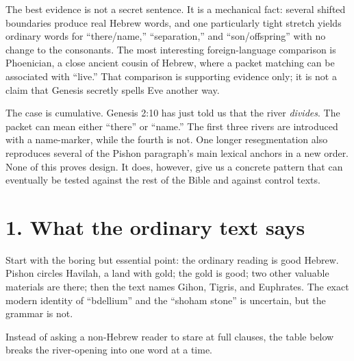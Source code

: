 The best evidence is not a secret sentence. It is a mechanical fact: several shifted boundaries produce real Hebrew words, and one particularly tight stretch yields ordinary words for ``there/name,'' ``separation,'' and ``son/offspring'' with no change to the consonants. The most interesting foreign-language comparison is Phoenician, a close ancient cousin of Hebrew, where a packet matching  can be associated with ``live.'' That comparison is supporting evidence only; it is not a claim that Genesis secretly spells Eve another way.

The case is cumulative. Genesis 2:10 has just told us that the river \emph{divides}. The packet  can mean either ``there'' or ``name.'' The first three rivers are introduced with a name-marker, while the fourth is not. One longer resegmentation also reproduces several of the Pishon paragraph's main lexical anchors in a new order. None of this proves design. It does, however, give us a concrete pattern that can eventually be tested against the rest of the Bible and against control texts.

\section*{1. What the ordinary text says}

Start with the boring but essential point: the ordinary reading is good Hebrew. Pishon circles Havilah, a land with gold; the gold is good; two other valuable materials are there; then the text names Gihon, Tigris, and Euphrates. The exact modern identity of ``bdellium'' and the ``shoham stone'' is uncertain, but the grammar is not.\cite{BDB,Westermann1984}

Instead of asking a non-Hebrew reader to stare at full clauses, the table below breaks the river-opening into one word at a time.


